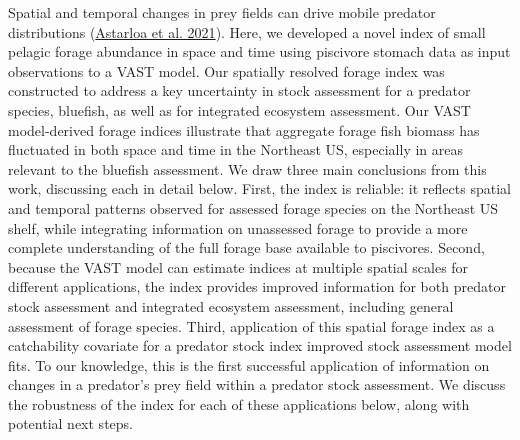 \documentclass[
]{article}
\begin{document}
Spatial and temporal changes in prey fields can drive mobile predator distributions (\protect\hyperlink{ref-astarloa_role_2021}{Astarloa et al. 2021}). Here, we developed a novel index of small pelagic forage abundance in space and time using piscivore stomach data as input observations to a VAST model. Our spatially resolved forage index was constructed to address a key uncertainty in stock assessment for a predator species, bluefish, as well as for integrated ecosystem assessment. Our VAST model-derived forage indices illustrate that aggregate forage fish biomass has fluctuated in both space and time in the Northeast US, especially in areas relevant to the bluefish assessment. We draw three main conclusions from this work, discussing each in detail below. First, the index is reliable: it reflects spatial and temporal patterns observed for assessed forage species on the Northeast US shelf, while integrating information on unassessed forage to provide a more complete understanding of the full forage base available to piscivores. Second, because the VAST model can estimate indices at multiple spatial scales for different applications, the index provides improved information for both predator stock assessment and integrated ecosystem assessment, including general assessment of forage species. Third, application of this spatial forage index as a catchability covariate for a predator stock index improved stock assessment model fits. To our knowledge, this is the first successful application of information on changes in a predator's prey field within a predator stock assessment. We discuss the robustness of the index for each of these applications below, along with potential next steps.
\end{document}
